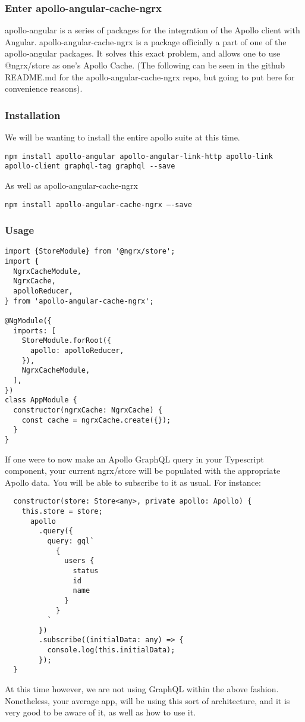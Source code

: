 \subsubsection{ Enter apollo-angular-cache-ngrx }
apollo-angular is a series of packages for the integration of the Apollo client
with Angular. apollo-angular-cache-ngrx is a package officially a part of one of
the apollo-angular packages. It solves this exact problem, and allows one to use
@ngrx/store as one’s Apollo Cache. (The following can be seen in the github
README.md for the apollo-angular-cache-ngrx repo, but going to put here for
convenience reasons).

\subsubsection{ Installation }
We will be wanting to install the entire apollo suite at this time.
\begin{lstlisting}
npm install apollo-angular apollo-angular-link-http apollo-link apollo-client graphql-tag graphql --save
\end{lstlisting}
As well as apollo-angular-cache-ngrx
\begin{lstlisting}
npm install apollo-angular-cache-ngrx —-save
\end{lstlisting}

\subsubsection{ Usage }
\begin{lstlisting}
import {StoreModule} from '@ngrx/store';
import {
  NgrxCacheModule,
  NgrxCache,
  apolloReducer,
} from 'apollo-angular-cache-ngrx';

@NgModule({
  imports: [
    StoreModule.forRoot({
      apollo: apolloReducer,
    }),
    NgrxCacheModule,
  ],
})
class AppModule {
  constructor(ngrxCache: NgrxCache) {
    const cache = ngrxCache.create({});
  }
}
\end{lstlisting}

If one were to now make an Apollo GraphQL query in your Typescript component,
your current ngrx/store will be populated with the appropriate Apollo data.
You will be able to subscribe to it as usual. For instance:
\begin{lstlisting}
  constructor(store: Store<any>, private apollo: Apollo) {
    this.store = store;
      apollo
        .query({
          query: gql`
            {
              users {
                status
                id
                name
              }
            }
          `
        })
        .subscribe((initialData: any) => {
          console.log(this.initialData);
        });
  }
\end{lstlisting}

At this time however, we are not using GraphQL within the above fashion.
Nonetheless, your average app, will be using this sort of architecture, and it
is very good to be aware of it, as well as how to use it.
